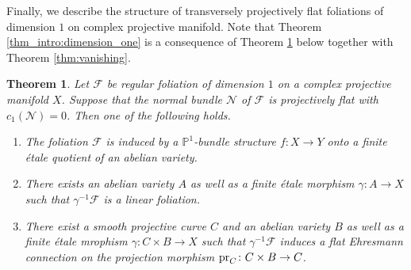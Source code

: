 \documentclass[english,10pt]{amsart}
\newcommand{\cF}{\mathcal{F}}
\newcommand{\sN}{\mathscr{N}}
\newtheorem{thm}{Theorem}[section]
\theoremstyle{definition}
\theoremstyle{remark}
\numberwithin{equation}{section}
\begin{document}
Finally, we describe the structure of transversely projectively flat foliations of dimension $1$ on complex projective manifold. Note that Theorem \ref{thm_intro:dimension_one} is a consequence of Theorem \ref{thm:dimension_one} below together with Theorem \ref{thm:vanishing}.

\begin{thm}\label{thm:dimension_one}
Let $\cF$ be regular foliation of dimension $1$ on a complex projective manifold $X$. Suppose that the normal bundle $\sN$ of $\cF$ is projectively flat with $c_1(\sN)=0$. Then one of the following holds.
\begin{enumerate}
\item The foliation $\cF$ is induced by a $\mathbb{P}^1$-bundle structure $f\colon X \to Y$ onto a finite \'etale quotient of an abelian variety.
\item There exists an abelian variety $A$ as well as a finite \'etale morphism $\gamma\colon A \to X$ such that $\gamma^{-1}\cF$ is a linear foliation.
\item There exist a smooth projective curve $C$ and an abelian variety $B$ as well as a finite \'etale mrophism $\gamma\colon C \times B \to X$ such that $\gamma^{-1}\cF$ induces a flat Ehresmann connection on the projection morphism $\textup{pr}_C \colon C \times B \to C$.
\end{enumerate}
\end{thm}
\end{document}
